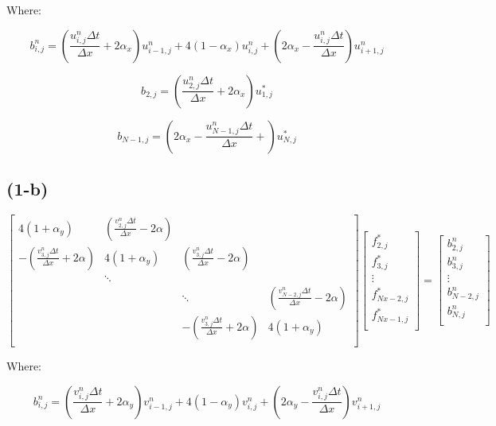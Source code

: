 \documentclass[12pt]{article}
\begin{document}
Where:

\begin{equation}
	b_{i,j}^n = (\frac{u_{i,j}^n\Delta t}{\Delta x} + 2 \alpha_x)u_{i-1,j}^n + 4(1-\alpha_x)u_{i,j}^n + (2 \alpha_x - \frac{u_{i,j}^n\Delta t}{\Delta x})u_{i+1,j}^n
\end{equation}

\begin{equation}
	b_{2,j} = (\frac{u_{2,j}^n\Delta t}{\Delta x} + 2 \alpha_x)u_{1,j}^*
\end{equation}

\begin{equation}
b_{N-1,j} = ( 2 \alpha_x - \frac{u_{N-1,j}^n\Delta t}{\Delta x} +)u_{N,j}^*
\end{equation}
\subsection{(1-b)}	
\[
\begin{bmatrix} 
4(1+\alpha_y) & (\frac{v_{2,j}^n\Delta t}{\Delta x} - 2\alpha)   &			   &\\
-(\frac{v_{3,j}^n\Delta t}{\Delta x} + 2\alpha) & 4(1+\alpha_y) & (\frac{v_{3,j}^n\Delta t}{\Delta x} - 2\alpha)  &\\
& \ddots &			   &\\
&	 	  & \ddots & (\frac{v_{N-2,j}^n\Delta t}{\Delta x} - 2\alpha)  \\
&		  & -(\frac{v_{3,j}^n\Delta t}{\Delta x} + 2\alpha) & 4(1+\alpha_y)  \\ 
\end{bmatrix}
\begin{bmatrix} 
f_{2,j}^{*}\\
f_{3,j}^{*}\\
\vdots\\
f_{Nx-2,j}^{*}\\
f_{Nx-1,j}^{*}\\ 
\end{bmatrix} = 
\begin{bmatrix} 
b_{2,j}^n\\
b_{3,j}^n\\
\vdots\\
b_{N-2,j}^n\\
b_{N,j}^n\\ 
\end{bmatrix}
\]

Where:

\begin{equation}
b_{i,j}^n = (\frac{v_{i,j}^n\Delta t}{\Delta x} + 2 \alpha_y)v_{i-1,j}^n + 4(1-\alpha_y)v_{i,j}^n + (2 \alpha_y - \frac{v_{i,j}^n\Delta t}{\Delta x})v_{i+1,j}^n
\end{equation}
\end{document}
